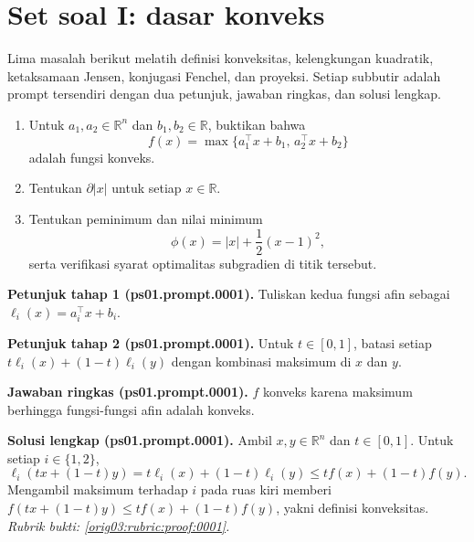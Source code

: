
\section{Set soal I: dasar konveks}
\label{orig03:section:set-soal-dasar-konveks}

Lima masalah berikut melatih definisi konveksitas, kelengkungan kuadratik,
ketaksamaan Jensen, konjugasi Fenchel, dan proyeksi. Setiap subbutir adalah
prompt tersendiri dengan dua petunjuk, jawaban ringkas, dan solusi lengkap.

\begin{exercise}
\label{orig03:ps01:problem:0001}
\begin{enumerate}
\item\label{orig03:ps01:prompt:0001}
Untuk $a_1,a_2\in\mathbb{R}^n$ dan $b_1,b_2\in\mathbb{R}$, buktikan bahwa
\[
  f(x)=\max\{a_1^\top x+b_1,\,a_2^\top x+b_2\}
\]
adalah fungsi konveks.
\item\label{orig03:ps01:prompt:0002}
Tentukan $\partial |x|$ untuk setiap $x\in\mathbb{R}$.
\item\label{orig03:ps01:prompt:0003}
Tentukan peminimum dan nilai minimum
\[
  \phi(x)=|x|+\frac12(x-1)^2,
\]
serta verifikasi syarat optimalitas subgradien di titik tersebut.
\end{enumerate}
\end{exercise}

\par\noindent\textbf{Petunjuk tahap 1 (ps01.prompt.0001).}
Tuliskan kedua fungsi afin sebagai $\ell_i(x)=a_i^\top x+b_i$.
\label{orig03:ps01:hint1:0001}
\par\noindent\textbf{Petunjuk tahap 2 (ps01.prompt.0001).}
Untuk $t\in[0,1]$, batasi setiap
$t\ell_i(x)+(1-t)\ell_i(y)$ dengan kombinasi maksimum di $x$ dan $y$.
\label{orig03:ps01:hint2:0001}
\par\noindent\textbf{Jawaban ringkas (ps01.prompt.0001).}
$f$ konveks karena maksimum berhingga fungsi-fungsi afin adalah konveks.
\label{orig03:ps01:answer:0001}
\par\noindent\textbf{Solusi lengkap (ps01.prompt.0001).}
Ambil $x,y\in\mathbb{R}^n$ dan $t\in[0,1]$. Untuk setiap $i\in\{1,2\}$,
\[
 \ell_i(tx+(1-t)y)
 =t\ell_i(x)+(1-t)\ell_i(y)
 \leq t f(x)+(1-t)f(y).
\]
Mengambil maksimum terhadap $i$ pada ruas kiri memberi
$f(tx+(1-t)y)\leq t f(x)+(1-t)f(y)$, yakni definisi konveksitas.
\emph{Rubrik bukti: \ref{orig03:rubric:proof:0001}.}
\label{orig03:ps01:solution:0001}


